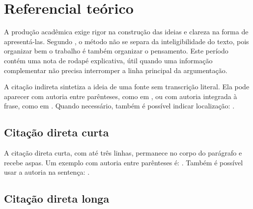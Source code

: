 %
%
%
%
%

\chapter{Referencial teórico}

A produção acadêmica exige rigor na construção das ideias e clareza na forma de apresentá-las. Segundo , o método não se separa da inteligibilidade do texto, pois organizar bem o trabalho é também organizar o pensamento. Este período contém uma nota de rodapé explicativa, útil quando uma informação complementar não precisa interromper a linha principal da argumentação.


A citação indireta sintetiza a ideia de uma fonte sem transcrição literal. Ela pode aparecer com autoria entre parênteses, como em , ou com autoria integrada à frase, como em . Quando necessário, também é possível indicar localização: .

\section{Citação direta curta}

A citação direta curta, com até três linhas, permanece no corpo do parágrafo e recebe aspas. Um exemplo com autoria entre parênteses é: . Também é possível usar a autoria na sentença: .

\section{Citação direta longa}

